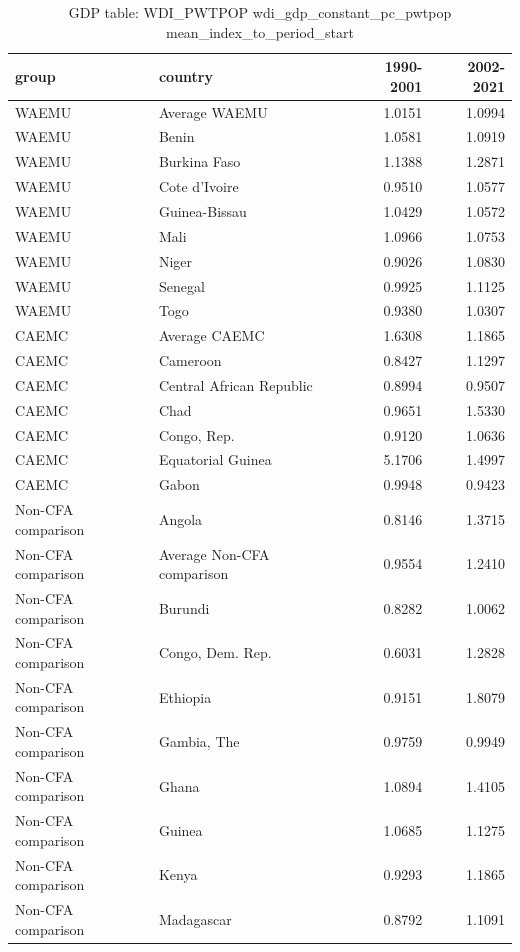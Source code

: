 \begin{table}

\caption{GDP table: WDI_PWTPOP wdi_gdp_constant_pc_pwtpop mean_index_to_period_start}
\centering
\begin{tabular}[t]{llrr}
\toprule
group & country & 1990-2001 & 2002-2021\\
\midrule
WAEMU & Average WAEMU & 1.0151 & 1.0994\\
WAEMU & Benin & 1.0581 & 1.0919\\
WAEMU & Burkina Faso & 1.1388 & 1.2871\\
WAEMU & Cote d'Ivoire & 0.9510 & 1.0577\\
WAEMU & Guinea-Bissau & 1.0429 & 1.0572\\
\addlinespace
WAEMU & Mali & 1.0966 & 1.0753\\
WAEMU & Niger & 0.9026 & 1.0830\\
WAEMU & Senegal & 0.9925 & 1.1125\\
WAEMU & Togo & 0.9380 & 1.0307\\
CAEMC & Average CAEMC & 1.6308 & 1.1865\\
\addlinespace
CAEMC & Cameroon & 0.8427 & 1.1297\\
CAEMC & Central African Republic & 0.8994 & 0.9507\\
CAEMC & Chad & 0.9651 & 1.5330\\
CAEMC & Congo, Rep. & 0.9120 & 1.0636\\
CAEMC & Equatorial Guinea & 5.1706 & 1.4997\\
\addlinespace
CAEMC & Gabon & 0.9948 & 0.9423\\
Non-CFA comparison & Angola & 0.8146 & 1.3715\\
Non-CFA comparison & Average Non-CFA comparison & 0.9554 & 1.2410\\
Non-CFA comparison & Burundi & 0.8282 & 1.0062\\
Non-CFA comparison & Congo, Dem. Rep. & 0.6031 & 1.2828\\
\addlinespace
Non-CFA comparison & Ethiopia & 0.9151 & 1.8079\\
Non-CFA comparison & Gambia, The & 0.9759 & 0.9949\\
Non-CFA comparison & Ghana & 1.0894 & 1.4105\\
Non-CFA comparison & Guinea & 1.0685 & 1.1275\\
Non-CFA comparison & Kenya & 0.9293 & 1.1865\\
\addlinespace
Non-CFA comparison & Madagascar & 0.8792 & 1.1091\\

\end{tabular}
\end{table}
